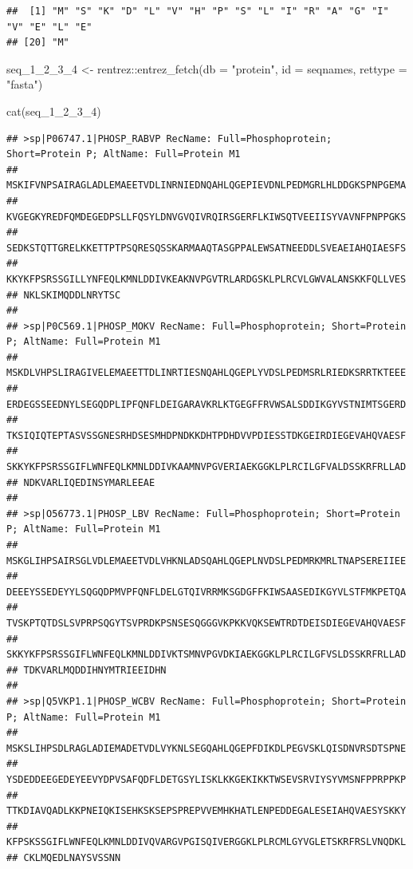 \documentclass[
]{book}
\newenvironment{Shaded}{\begin{snugshade}}{\end{snugshade}}
\newcommand{\AttributeTok}[1]{\textcolor[rgb]{0.77,0.63,0.00}{#1}}
\newcommand{\FunctionTok}[1]{\textcolor[rgb]{0.00,0.00,0.00}{#1}}
\newcommand{\NormalTok}[1]{#1}
\newcommand{\OtherTok}[1]{\textcolor[rgb]{0.56,0.35,0.01}{#1}}
\newcommand{\SpecialCharTok}[1]{\textcolor[rgb]{0.00,0.00,0.00}{#1}}
\newcommand{\StringTok}[1]{\textcolor[rgb]{0.31,0.60,0.02}{#1}}
\begin{document}
\begin{verbatim}
##  [1] "M" "S" "K" "D" "L" "V" "H" "P" "S" "L" "I" "R" "A" "G" "I" "V" "E" "L" "E"
## [20] "M"
\end{verbatim}

\begin{Shaded}
\begin{Highlighting}[]
\NormalTok{seq\_1\_2\_3\_4 }\OtherTok{\textless{}{-}}\NormalTok{ rentrez}\SpecialCharTok{::}\FunctionTok{entrez\_fetch}\NormalTok{(}\AttributeTok{db =} \StringTok{"protein"}\NormalTok{, }
                          \AttributeTok{id =}\NormalTok{ seqnames, }
                          \AttributeTok{rettype =} \StringTok{"fasta"}\NormalTok{)}
\end{Highlighting}
\end{Shaded}

\begin{Shaded}
\begin{Highlighting}[]
\FunctionTok{cat}\NormalTok{(seq\_1\_2\_3\_4)}
\end{Highlighting}
\end{Shaded}

\begin{verbatim}
## >sp|P06747.1|PHOSP_RABVP RecName: Full=Phosphoprotein; Short=Protein P; AltName: Full=Protein M1
## MSKIFVNPSAIRAGLADLEMAEETVDLINRNIEDNQAHLQGEPIEVDNLPEDMGRLHLDDGKSPNPGEMA
## KVGEGKYREDFQMDEGEDPSLLFQSYLDNVGVQIVRQIRSGERFLKIWSQTVEEIISYVAVNFPNPPGKS
## SEDKSTQTTGRELKKETTPTPSQRESQSSKARMAAQTASGPPALEWSATNEEDDLSVEAEIAHQIAESFS
## KKYKFPSRSSGILLYNFEQLKMNLDDIVKEAKNVPGVTRLARDGSKLPLRCVLGWVALANSKKFQLLVES
## NKLSKIMQDDLNRYTSC
## 
## >sp|P0C569.1|PHOSP_MOKV RecName: Full=Phosphoprotein; Short=Protein P; AltName: Full=Protein M1
## MSKDLVHPSLIRAGIVELEMAEETTDLINRTIESNQAHLQGEPLYVDSLPEDMSRLRIEDKSRRTKTEEE
## ERDEGSSEEDNYLSEGQDPLIPFQNFLDEIGARAVKRLKTGEGFFRVWSALSDDIKGYVSTNIMTSGERD
## TKSIQIQTEPTASVSSGNESRHDSESMHDPNDKKDHTPDHDVVPDIESSTDKGEIRDIEGEVAHQVAESF
## SKKYKFPSRSSGIFLWNFEQLKMNLDDIVKAAMNVPGVERIAEKGGKLPLRCILGFVALDSSKRFRLLAD
## NDKVARLIQEDINSYMARLEEAE
## 
## >sp|O56773.1|PHOSP_LBV RecName: Full=Phosphoprotein; Short=Protein P; AltName: Full=Protein M1
## MSKGLIHPSAIRSGLVDLEMAEETVDLVHKNLADSQAHLQGEPLNVDSLPEDMRKMRLTNAPSEREIIEE
## DEEEYSSEDEYYLSQGQDPMVPFQNFLDELGTQIVRRMKSGDGFFKIWSAASEDIKGYVLSTFMKPETQA
## TVSKPTQTDSLSVPRPSQGYTSVPRDKPSNSESQGGGVKPKKVQKSEWTRDTDEISDIEGEVAHQVAESF
## SKKYKFPSRSSGIFLWNFEQLKMNLDDIVKTSMNVPGVDKIAEKGGKLPLRCILGFVSLDSSKRFRLLAD
## TDKVARLMQDDIHNYMTRIEEIDHN
## 
## >sp|Q5VKP1.1|PHOSP_WCBV RecName: Full=Phosphoprotein; Short=Protein P; AltName: Full=Protein M1
## MSKSLIHPSDLRAGLADIEMADETVDLVYKNLSEGQAHLQGEPFDIKDLPEGVSKLQISDNVRSDTSPNE
## YSDEDDEEGEDEYEEVYDPVSAFQDFLDETGSYLISKLKKGEKIKKTWSEVSRVIYSYVMSNFPPRPPKP
## TTKDIAVQADLKKPNEIQKISEHKSKSEPSPREPVVEMHKHATLENPEDDEGALESEIAHQVAESYSKKY
## KFPSKSSGIFLWNFEQLKMNLDDIVQVARGVPGISQIVERGGKLPLRCMLGYVGLETSKRFRSLVNQDKL
## CKLMQEDLNAYSVSSNN
\end{verbatim}
\end{document}
